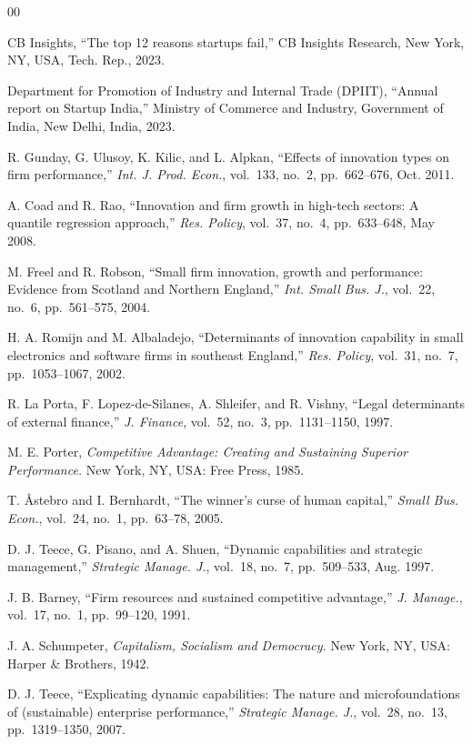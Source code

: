 \documentclass{ieeeaccess}
\begin{document}
\begin{thebibliography}{00}

 CB Insights, ``The top 12 reasons startups fail,''
CB Insights Research, New York, NY, USA, Tech. Rep., 2023.

 Department for Promotion of Industry and Internal Trade
(DPIIT), ``Annual report on Startup India,'' Ministry of Commerce and
Industry, Government of India, New Delhi, India, 2023.

 R. Gunday, G. Ulusoy, K. Kilic, and L. Alpkan, ``Effects of
innovation types on firm performance,'' \emph{Int. J. Prod. Econ.},
vol.~133, no.~2, pp.~662--676, Oct. 2011.

 A. Coad and R. Rao, ``Innovation and firm growth in
high-tech sectors: A quantile regression approach,'' \emph{Res. Policy},
vol.~37, no.~4, pp.~633--648, May 2008.

 M. Freel and R. Robson, ``Small firm innovation, growth and
performance: Evidence from Scotland and Northern England,''
\emph{Int. Small Bus. J.}, vol.~22, no.~6, pp.~561--575, 2004.

 H. A. Romijn and M. Albaladejo, ``Determinants of innovation
capability in small electronics and software firms in southeast England,''
\emph{Res. Policy}, vol.~31, no.~7, pp.~1053--1067, 2002.

 R. La Porta, F. Lopez-de-Silanes, A. Shleifer, and
R. Vishny, ``Legal determinants of external finance,''
\emph{J. Finance}, vol.~52, no.~3, pp.~1131--1150, 1997.

 M. E. Porter, \emph{Competitive Advantage: Creating and
Sustaining Superior Performance.} New York, NY, USA: Free Press, 1985.

 T. Åstebro and I. Bernhardt, ``The winner's curse of human
capital,'' \emph{Small Bus. Econ.}, vol.~24, no.~1, pp.~63--78, 2005.

 D. J. Teece, G. Pisano, and A. Shuen, ``Dynamic capabilities
and strategic management,'' \emph{Strategic Manage. J.}, vol.~18, no.~7,
pp.~509--533, Aug. 1997.

 J. B. Barney, ``Firm resources and sustained competitive
advantage,'' \emph{J. Manage.}, vol.~17, no.~1, pp.~99--120, 1991.

 J. A. Schumpeter, \emph{Capitalism, Socialism and Democracy.}
New York, NY, USA: Harper \& Brothers, 1942.

 D. J. Teece, ``Explicating dynamic capabilities: The nature
and microfoundations of (sustainable) enterprise performance,''
\emph{Strategic Manage. J.}, vol.~28, no.~13, pp.~1319--1350, 2007.


\end{thebibliography}
\end{document}
